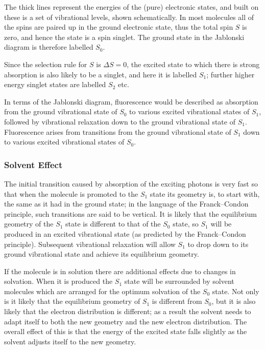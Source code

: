 \documentclass{article}
\theoremstyle{plain}\theoremheaderfont{\normalfont\itshape}\theorembodyfont{\rmfamily}\theoremseparator{.}\newtheorem*{rem}{Remark}\newtheorem*{ex}{Example}\newtheorem*{proof}{Proof}\newtheorem*{altp}{Alternative proof}
\theoremstyle{plain}\theoremheaderfont{\normalfont\bfseries}\theorembodyfont{\rmfamily}\theoremseparator{.}\newtheorem{thm}{Theorem}[section]\newtheorem{lem}[thm]{Lemma}\newtheorem{prop}[thm]{Proposition}\newtheorem*{cor}{Corollary}\newtheorem{defn}[thm]{Definition}\newtheorem{clm}[thm]{Claim}\newtheorem{clminproof}{Claim}\newtheorem{pos}{Postulate}[section]
\theoremstyle{break}\theoremheaderfont{\normalfont\itshape}\theorembodyfont{\rmfamily}\theoremseparator{.\medskip}\newtheorem*{proofskip}{Proof}\newtheorem*{exs}{Examples}\newtheorem*{rems}{Remarks}
\theoremstyle{break}\theoremheaderfont{\normalfont\bfseries}\theorembodyfont{\rmfamily}\theoremseparator{.\medskip}\newtheorem{lemskip}[thm]{Lemma}\newtheorem{defnskip}[thm]{Definition}\newtheorem{propskip}[thm]{Proposition}\newtheorem{thmskip}[thm]{Theorem}
\numberwithin{equation}{section}
\begin{document}
    The thick lines represent the energies of the (pure) electronic states, and built on these is a set of vibrational levels, shown schematically. In most molecules all of the spins are paired up in the ground electronic state, thus the total spin \(S\) is zero, and hence the state is a spin singlet. The ground state in the Jablonski diagram is therefore labelled \(S_0\).

    Since the selection rule for \(S\) is \(\Delta S=0\), the excited state to which there is strong absorption is also likely to be a singlet, and here it is labelled \(S_1\); further higher energy singlet states are labelled \(S_2\) etc.
    
    In terms of the Jablonski diagram, fluorescence would be described as absorption from the ground vibrational state of \(S_0\) to various excited vibrational states of \(S_1\), followed by vibrational relaxation down to the ground vibrational state of \(S_1\). Fluorescence arises from transitions from the ground vibrational state of \(S_1\) down to various excited vibrational states of \(S_0\).

    \subsubsection{Solvent Effect}
    The initial transition caused by absorption of the exciting photons is very fast so that when the molecule is promoted to the \(S_1\) state its geometry is, to start with, the same as it had in the ground state; in the language of the Franck--Condon principle, such transitions are said to be vertical. It is likely that the equilibrium geometry of the \(S_1\) state is different to that of the \(S_0\) state, so \(S_1\) will be produced in an excited vibrational state (as predicted by the Franck--Condon principle). Subsequent vibrational relaxation will allow \(S_1\) to drop down to its ground vibrational state and achieve its equilibrium geometry.

    If the molecule is in solution there are additional effects due to changes in solvation. When it is produced the \(S_1\) state will be surrounded by solvent molecules which are arranged for the optimum solvation of the \(S_0\) state. Not only is it likely that the equilibrium geometry of \(S_1\) is different from \(S_0\), but it is also likely that the electron distribution is different; as a result the solvent needs to adapt itself to both the new geometry and the new electron distribution. The overall effect of this is that the energy of the excited state falls slightly as the solvent adjusts itself to the new geometry.
\end{document}
